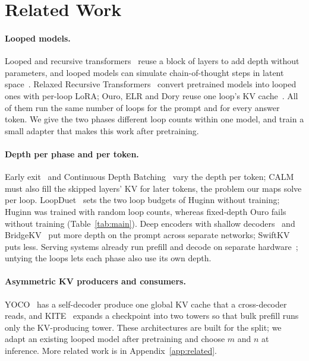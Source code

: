 \documentclass[11pt]{article}
\begin{document}
\section{Related Work}
\label{sec:related}

\paragraph{Looped models.} Looped and recursive transformers~\citep{ut,huginn,ouro,relaxedrecursive,mor} reuse a
block of layers to add depth without parameters, and looped models can simulate chain-of-thought steps in latent
space~\citep{saunshi2025latent}. Relaxed Recursive Transformers~\citep{relaxedrecursive} convert pretrained models into
looped ones with per-loop LoRA; Ouro, ELR and Dory reuse one loop's KV cache~\citep{ouro,elr,dory}. All of them run the
same number of loops for the prompt and for every answer token. We give the two phases different loop counts within
one model, and train a small adapter that makes this work after pretraining.

\paragraph{Depth per phase and per token.} Early exit~\citep{calm,layerskip} and Continuous Depth Batching~\citep{cdb}
vary the depth per token; CALM must also fill the skipped layers' KV for later tokens, the problem our maps solve per
loop. LoopDuet~\citep[concurrent;][]{loopduet} sets the two loop budgets of Huginn without training; Huginn was trained
with random loop counts, whereas fixed-depth Ouro fails without training (Table~\ref{tab:main}). Deep encoders with
shallow decoders~\citep{deepshallow,llm2slm,tandem} and BridgeKV~\citep[concurrent;][]{bridgekv} put more depth on the
prompt across separate networks; SwiftKV~\citep{swiftkv} puts less. Serving systems already run prefill and decode on
separate hardware~\citep{distserve,splitwise}; untying the loops lets each phase also use its own depth.

\paragraph{Asymmetric KV producers and consumers.} YOCO~\citep{yoco} has a self-decoder produce one global KV cache
that a cross-decoder reads, and KITE~\citep{kite} expands a checkpoint into two towers so that bulk prefill runs only
the KV-producing tower. These architectures are built for the split; we adapt an existing looped model after
pretraining and choose $m$ and $n$ at inference. More related work is in Appendix~\ref{app:related}.
\end{document}
